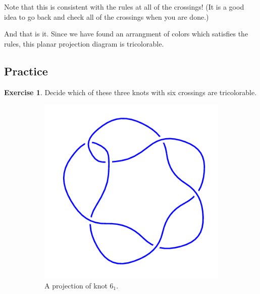 \documentclass[12pt,letterpaper]{article}
\theoremstyle{definition}
\newtheorem{exercise}[question]{Exercise}
\begin{document}
Note that this is consistent with the rules at all of the crossings!
(It is a good idea to go back and check all of the crossings when you are done.)

And that is it.
Since we have found an arrangment of colors which satisfies the rules, this planar projection diagram is tricolorable.


\subsection*{Practice}

\begin{exercise}
Decide which of these three knots with six crossings are tricolorable.
\end{exercise}

\begin{figure}[h]
    \centering
    \begin{subfigure}{.3\textwidth}
        \centering
        \includegraphics[width=\textwidth]{rgp08pics/6_1.png}
        \caption{A projection of knot $6_1$.}
    \end{subfigure}
    \quad
    \begin{subfigure}{.3\textwidth}
        \centering

\end{subfigure}
\end{figure}
\end{document}
